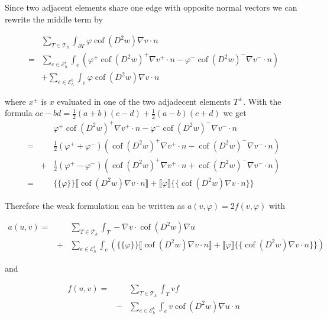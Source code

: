 \documentclass[a4paper,11pt]{article}
\newcommand{\myint}{\displaystyle\int}
\newcommand{\cof}{\operatorname{cof}}
\newcommand{\edgesi}{\mathcal{E}_h^i}
\newcommand{\edgesb}{\mathcal{E}_h^b}
\newcommand{\triang}{\mathcal{T}_h}
\begin{document}
Since two adjacent elements share one edge with opposite normal vectors we can rewrite the middle term by

\begin{eqnarray*}
&\sum\limits_{T \in \triang}\myint_{\partial T} \varphi \cof(D^2 w) \nabla v \cdot n \\
= &\sum\limits_{e \in \edgesi}\myint_{e} \left( \varphi^+ \cof(D^2 w)^+ \nabla v^+ \cdot n - \varphi^- \cof(D^2 w)^- \nabla v^- \cdot n \right) \\
& + \sum\limits_{e \in \edgesb}\myint_{e} \varphi \cof(D^2 w) \nabla v \cdot n
\end{eqnarray*}

where $x^\pm $ is $x$ evaluated in one of the two adjadecent elements $T^\pm$. With the formula $ac-bd = \frac 1 2 (a+b)(c-d) + \frac 1 2 (a-b)(c+d)$ we get
\begin{eqnarray*}
	&&\varphi^+ \cof(D^2 w)^+ \nabla v^+ \cdot n - \varphi^- \cof(D^2 w)^- \nabla v^- \cdot n \\
	= && \frac 1 2 \left(\varphi^+ + \varphi^- \right) \left(\cof(D^2 w)^+ \nabla v^+ \cdot n - \cof(D^2 w)^- \nabla v^- \cdot n \right) \\
  &+ & \frac 1 2 \left(\varphi^+ - \varphi^- \right) \left(\cof(D^2 w)^+ \nabla v^+ \cdot n + \cof(D^2 w)^- \nabla v^- \cdot n \right) \\
  = &&  \{\{\varphi\}\} \llbracket \cof(D^2 w) \nabla v \cdot n \rrbracket + \llbracket\varphi\rrbracket \{\{ \cof(D^2 w) \nabla v \cdot n \}\}
\end{eqnarray*}

Therefore the weak formulation can be written as $a(v,\varphi) = 2f(v, \varphi)$ with 

\begin{eqnarray*}
 a(u,v) = & &\sum\limits_{T \in \triang} \myint_T -\nabla v \cdot \cof(D^2 w) \nabla u \\
	 &+ &\sum\limits_{e \in \edgesi}\myint_{e} \left( \{\{\varphi\}\} \llbracket \cof(D^2 w) \nabla v \cdot n \rrbracket + \llbracket\varphi\rrbracket \{\{ \cof(D^2 w) \nabla v \cdot n \}\} \right)
\end{eqnarray*}

and

\begin{eqnarray*}
	f(u,v) = && \sum\limits_{T \in \triang} \myint_T v f \\
	 				&- &\sum\limits_{e \in \edgesb}\myint_{e} v \cof(D^2 w) \nabla u \cdot n 
\end{eqnarray*} 
\end{document}
